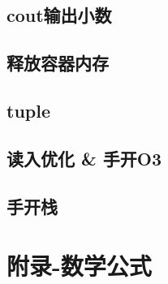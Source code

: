 \documentclass[titlepage,a4paper,10pt]{article}
\begin{document}
\begin{multicols}{2}
\begin{spacing}{0.8}
			\subsection{cout输出小数}
				
			\subsection{释放容器内存}
				
			\subsection{tuple}
				
			\subsection{读入优化 \& 手开O3}
				
			\subsection{手开栈}
				
		\section{附录-数学公式}
			\subsection{}
				
				
		\end{spacing}
		\endgroup
	\end{multicols}
\end{document}
